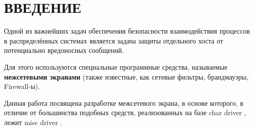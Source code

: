 \section*{ВВЕДЕНИЕ}

Одной из важнейших задач обеспечения безопасности взаимодействия процессов в распределённых системах является задача защиты отдельного хоста от потенциально вредоносных сообщений. 

Для этого используются специальные программные средства, называемые \textbf{межсетевыми экранами} (также известные, как сетевые фильтры, брандмауэры, Firewall-ы).

Данная работа посвящена разработке межсетевого экрана, в основе которого, в отличие от большинства подобных средств, реализованных на базе char driver \cite{2nd}, лежит misc driver \cite{misc}.
